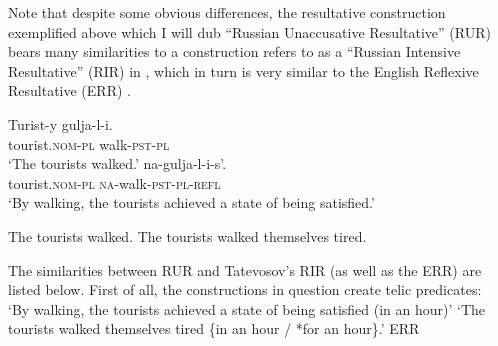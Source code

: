 \documentclass[output=paper,colorlinks,citecolor=brown,modfonts,nonflat]{langsci/langscibook}
\begin{document}
Note that despite some obvious differences, the resultative construction exemplified above which I will dub “Russian Unaccusative Resultative” (RUR) bears many similarities to a construction \citet{Tatevosov2010} refers to as a “Russian Intensive Resultative” (RIR) in , which in turn is very similar to the English Reflexive Resultative (ERR) .


\ea%
    \label{ex:antonyuk:35}
    \ea \label{ex:antonyuk:35a}
    \gll    Turist-y gulja-l-i.\\
            tourist\textsc{.nom-pl} walk\textsc{-pst-pl}\\
    \glt    `The tourists walked.'
    \ex \label{ex:antonyuk:35b}
      {na-gulja-l-i-s’}.\\
            tourist\textsc{.nom-pl} \textsc{na-}walk\textsc{-pst-pl-refl}\\
    \glt    `By walking, the tourists achieved a state of being satisfied.'
    \z
\z

\ea%
    \label{ex:antonyuk:36}
    \ea \label{ex:antonyuk:36a}
    The tourists walked.
    \ex \label{ex:antonyuk:36b}
     {The tourists walked themselves tired.}
    \z
\z

The similarities between RUR and Tatevosov’s RIR (as well as the ERR) are listed below. First of all, the constructions in question create telic predicates:\\

\ea%
    \label{ex:antonyuk:37}
    \glt    ‘By walking, the tourists achieved a state of being satisfied (in an hour)’
    \ex \label{ex:antonyuk:37b}
    `The tourists walked themselves tired \{in an hour / *for an hour\}.' \hfill{ERR}
    \z
\z
\end{document}
